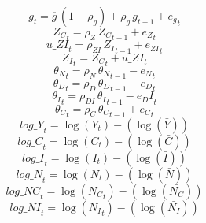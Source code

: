 \begin{dmath}
{{g}}_{t}={{\overline{g}}}\, \left(1-{{\rho_g}}\right)+{{\rho_g}}\, {{g}}_{t-1}+{{e_g}}_{t}
\end{dmath}
\begin{dmath}
{{Z_C}}_{t}={{\rho_Z}}\, {{Z_C}}_{t-1}+{{e_Z}}_{t}
\end{dmath}
\begin{dmath}
{u\_ZI}_{t}={{\rho_{ZI}}}\, {{Z_I}}_{t-1}+{{e_{ZI}}}_{t}
\end{dmath}
\begin{dmath}
{{Z_I}}_{t}={{Z_C}}_{t}+{u\_ZI}_{t}
\end{dmath}
\begin{dmath}
{{\theta_N}}_{t}={{\rho_N}}\, {{\theta_N}}_{t-1}-{{e_N}}_{t}
\end{dmath}
\begin{dmath}
{{\theta_D}}_{t}={{\rho_D}}\, {{\theta_D}}_{t-1}-{{e_D}}_{t}
\end{dmath}
\begin{dmath}
{{\theta_I}}_{t}={{\rho_{DI}}}\, {{\theta_I}}_{t-1}-{{e_DI}}_{t}
\end{dmath}
\begin{dmath}
{{\theta_C}}_{t}={{\rho_C}}\, {{\theta_C}}_{t-1}+{{e_C}}_{t}
\end{dmath}
\begin{dmath}
{log\_Y}_{t}=\log\left({{Y}}_{t}\right)-(\log\left(\bar{{Y}}\right))
\end{dmath}
\begin{dmath}
{log\_C}_{t}=\log\left({{C}}_{t}\right)-(\log\left(\bar{{C}}\right))
\end{dmath}
\begin{dmath}
{log\_I}_{t}=\log\left({{I}}_{t}\right)-(\log\left(\bar{{I}}\right))
\end{dmath}
\begin{dmath}
{log\_N}_{t}=\log\left({{N}}_{t}\right)-(\log\left(\bar{{N}}\right))
\end{dmath}
\begin{dmath}
{log\_NC}_{t}=\log\left({{N_C}}_{t}\right)-(\log\left(\bar{{N_C}}\right))
\end{dmath}
\begin{dmath}
{log\_NI}_{t}=\log\left({{N_I}}_{t}\right)-(\log\left(\bar{{N_I}}\right))
\end{dmath}
